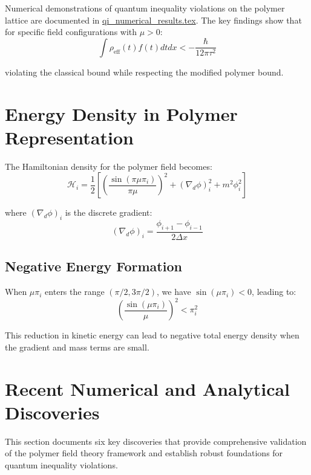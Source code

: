 \documentclass[12pt]{article}
\begin{document}
Numerical demonstrations of quantum inequality violations on the polymer lattice are documented in \href{file:qi_numerical_results.tex}{qi\_numerical\_results.tex}. The key findings show that for specific field configurations with $\mu > 0$:
\begin{equation}
\int \rho_{\text{eff}}(t) f(t) dt dx < -\frac{\hbar}{12\pi\tau^2}
\end{equation}

violating the classical bound while respecting the modified polymer bound.

\section{Energy Density in Polymer Representation}

The Hamiltonian density for the polymer field becomes:
\begin{equation}
\mathcal{H}_i = \frac{1}{2}\left[ \left(\frac{\sin(\pi\mu \pi_i)}{\pi\mu}\right)^2 + (\nabla_d \phi)_i^2 + m^2 \phi_i^2 \right]
\end{equation}

where $(\nabla_d \phi)_i$ is the discrete gradient:
\begin{equation}
(\nabla_d \phi)_i = \frac{\phi_{i+1} - \phi_{i-1}}{2\Delta x}
\end{equation}

\subsection{Negative Energy Formation}

When $\mu \pi_i$ enters the range $(\pi/2, 3\pi/2)$, we have $\sin(\mu \pi_i) < 0$, leading to:
\begin{equation}
\left(\frac{\sin(\mu \pi_i)}{\mu}\right)^2 < \pi_i^2
\end{equation}

This reduction in kinetic energy can lead to negative total energy density when the gradient and mass terms are small.

\section{Recent Numerical and Analytical Discoveries}

This section documents six key discoveries that provide comprehensive validation of the polymer field theory framework and establish robust foundations for quantum inequality violations.
\end{document}
